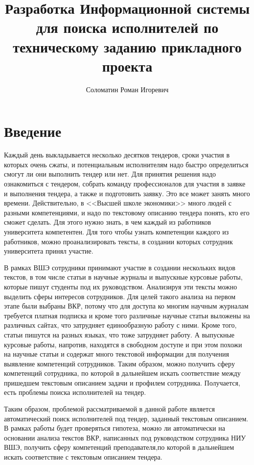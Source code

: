 \documentclass[PI,KR]{HSEUniversity}
\title{Разработка Информационной системы для поиска исполнителей по техническому заданию прикладного проекта}
\author{Соломатин Роман Игоревич}
\begin{document}
\maketitle

\chapter*{Введение}
Каждый день выкладывается несколько десятков тендеров, сроки участия в которых очень сжаты, и потенциальным исполнителям надо быстро определиться смогут ли они выполнить тендер или нет. Для принятия решения надо ознакомиться с тендером, собрать команду профессионалов для участия в заявке и выполнения тендера, а также и подготовить заявку. Это все может занять много времени. Действительно, в <<Высшей школе экономики>> много людей с разными компетенциями, и надо по текстовому описанию тендера понять, кто его сможет сделать. Для этого нужно знать, в чем каждый из работников университета компетентен. Для того чтобы узнать компетенции каждого из работников, можно проанализировать тексты, в создании которых сотрудник университета принял участие.

В рамках ВШЭ сотрудники принимают участие в создании нескольких видов текстов, в том числе статьи в научные журналы и выпускные курсовые работы, которые пишут студенты под их руководством. Анализируя эти тексты можно выделить сферы интересов сотрудников. Для целей такого анализа на первом этапе были выбраны ВКР, потому что для доступа ко многим научным журналам требуется платная подписка и кроме того различные научные статьи выложены на различных сайтах, что затрудняет единообразную работу с ними. Кроме того, статьи пишутся на разных языках, что тоже затрудняет работу. А выпускные курсовые работы, напротив, находятся в свободном доступе и при этом похожи на научные статьи и содержат много текстовой информации для получения выявление компетенций сотрудников. Таким образом, можно получить сферу компетенций сотрудника, по которой в дальнейшем искать соответствие между пришедшем текстовым описанием задачи и профилем сотрудника. Получается, есть проблемы поиска исполнителей на тендер. 

Таким образом, проблемой рассматриваемой в данной работе является автоматический поиск исполнителей под тендер, заданный текстовым описанием. В рамках работы будет проверяться гипотеза, можно ли автоматически на основании анализа текстов ВКР, написанных под руководством сотрудника НИУ ВШЭ, получить сферу компетенций преподавателя,по которой в дальнейшем искать соответствие с текстовым описанием тендера.
\end{document}
